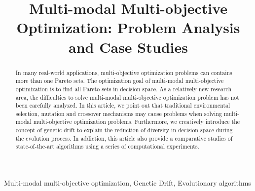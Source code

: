 \documentclass[conference]{IEEEtran}
\begin{document}
\title{Multi-modal Multi-objective Optimization: Problem Analysis and Case Studies
}
\author{
}

\maketitle

\begin{abstract}
In many real-world applications, multi-objective optimization problems can contains more than one Pareto sets. The optimization goal of multi-modal multi-objective optimization is to find all Pareto sets in decision space. As a relatively new research area, the difficulties to solve multi-modal multi-objective optimization problem has not been carefully analyzed. In this article, we point out that traditional environmental selection, mutation and crossover mechanisms may cause problems when solving multi-modal multi-objective optimization problems. Furthermore, we creatively introduce the concept of genetic drift to explain the reduction of diversity in decision space during the evolution process. In addiction, this article also provide a comparative studies of state-of-the-art algorithms using a series of computational experiments.
\end{abstract}

\begin{IEEEkeywords}
Multi-modal multi-objective optimization, Genetic Drift, Evolutionary algorithms
\end{IEEEkeywords}
\end{document}
